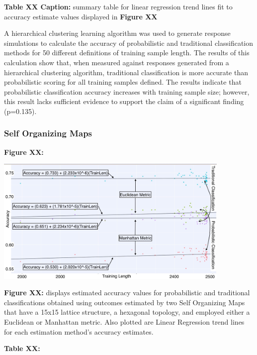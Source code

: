 \documentclass[12pt,]{article}
\begin{document}
\textbf{Table XX Caption:} summary table for linear regression trend
lines fit to accuracy estimate values displayed in \textbf{Figure XX}

A hierarchical clustering learning algorithm was used to generate
response simulations to calculate the accuracy of probabilistic and
traditional classification methods for 50 different definitions of
training sample length. The results of this calculation show that, when
measured against responses generated from a hierarchical clustering
algorithm, traditional classification is more accurate than
probabilistic scoring for all training samples defined. The results
indicate that probabilistic classification accuracy increases with
training sample size; however, this result lacks sufficient evidence to
support the claim of a significant finding (p=0.135).

\hypertarget{self-organizing-maps-1}{%
\subsubsection{Self Organizing Maps}\label{self-organizing-maps-1}}

\textbf{Figure XX:}

\begin{center}
\includegraphics[width=0.85\textwidth]{SomResultsGraph.jpeg}
\end{center}

\textbf{Figure XX:} displays estimated accuracy values for probabilistic
and traditional classifications obtained using outcomes estimated by two
Self Organizing Maps that have a 15x15 lattice structure, a hexagonal
topology, and employed either a Euclidean or Manhattan metric. Also
plotted are Linear Regression trend lines for each estimation method's
accuracy estimates.

\textbf{Table XX:}
\end{document}
